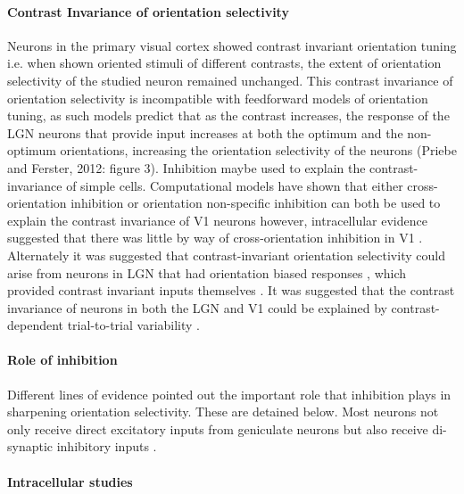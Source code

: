 \paragraph{Contrast Invariance of orientation selectivity}

Neurons in the primary visual cortex showed contrast invariant orientation tuning \cite{Sclar1982, Skottun1987, Alitto2004} i.e. when shown oriented stimuli of different contrasts, the extent of orientation selectivity of the studied neuron remained unchanged. This contrast invariance of orientation selectivity is incompatible with feedforward models of orientation tuning, as such models predict that as the contrast increases, the response of the LGN neurons that provide input increases at both the optimum and the non-optimum orientations, increasing the orientation selectivity of the neurons (Priebe and Ferster, 2012: figure 3). Inhibition maybe used to explain the contrast-invariance of simple cells. Computational models have shown that either cross-orientation inhibition \cite{Troyer1998} or orientation non-specific inhibition \cite{Ben-Yishai1995, Somers1995, Sompolinsky1997} can both be used to explain the contrast invariance of V1 neurons however, intracellular evidence suggested that there was little by way of cross-orientation inhibition in V1 \cite{Anderson2000}. Alternately it was suggested that contrast-invariant orientation selectivity could arise from neurons in LGN that had orientation biased responses \cite{Vidyasagar1982}, which provided contrast invariant inputs themselves \cite{Naito2013, Viswanathan2015}. It was suggested that the contrast invariance of neurons in both the LGN and V1 could be explained by contrast-dependent trial-to-trial variability \cite{Finn2007, Sadagopan2012, Priebe2012, Viswanathan2015}.


\paragraph{Role of inhibition}
Different lines of evidence pointed out the important role that inhibition plays in sharpening orientation selectivity. These are detained below. Most neurons not only receive direct excitatory inputs from geniculate neurons but also receive di-synaptic inhibitory inputs \cite{Creutzfeldt1968, Ferster1983}.


\paragraph{Intracellular studies}

